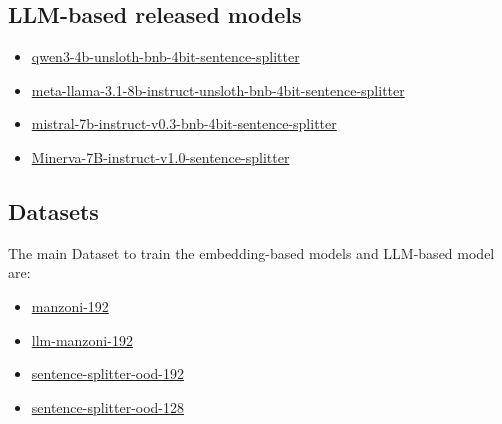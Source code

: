 \documentclass[11pt]{article}
\begin{document}
\subsection{LLM-based released models}

\begin{itemize}
	\item 
	\href{https://huggingface.co/fax4ever/qwen3-4b-unsloth-bnb-4bit-sentence-splitter}{qwen3-4b-unsloth-bnb-4bit-sentence-splitter}
	\item 
	\href{https://huggingface.co/fax4ever/meta-llama-3.1-8b-instruct-unsloth-bnb-4bit-sentence-splitter}{meta-llama-3.1-8b-instruct-unsloth-bnb-4bit-sentence-splitter}
	\item \href{https://huggingface.co/fax4ever/mistral-7b-instruct-v0.3-bnb-4bit-sentence-splitter}{mistral-7b-instruct-v0.3-bnb-4bit-sentence-splitter}
	\item \href{https://huggingface.co/fax4ever/Minerva-7B-instruct-v1.0-sentence-splitter}{Minerva-7B-instruct-v1.0-sentence-splitter}
\end{itemize}

\subsection{Datasets}

The main Dataset to train the embedding-based models and LLM-based model are:

\begin{itemize}
	\item \href{https://huggingface.co/datasets/fax4ever/manzoni-192}{manzoni-192}
	\item \href{https://huggingface.co/datasets/fax4ever/llm-manzoni-192}{llm-manzoni-192}
    \item \href{https://huggingface.co/datasets/fax4ever/sentence-splitter-ood-192}{sentence-splitter-ood-192}
    \item \href{https://huggingface.co/datasets/fax4ever/sentence-splitter-ood-128}{sentence-splitter-ood-128}
\end{itemize}
\end{document}
